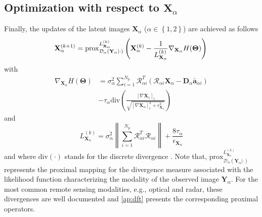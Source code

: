 \documentclass[review]{elsarticle}
\newcommand{\Npatch}{N_{\mathrm{p}}}
\begin{document}
\subsection{Optimization with respect to \texorpdfstring{$\mathbf{X}_{\alpha}$}{X}}

Finally, the updates of the latent images $\mathbf{X}_{\alpha}$ ($\alpha \in \left\{1,2\right\}$) are achieved as follows
%
\begin{equation}
 		\mathbf{X}_{\alpha}^{(k+1)} = \mathrm{prox}^{L_{\mathbf{X}_{\mathrm{\alpha}}}^{(k)}}_{\mathcal{D}_{\mathrm{\alpha}}(\mathbf{Y}_{\mathrm{\alpha}}|\cdot)}\left(\mathbf{X}_{\alpha}^{(k)} - \frac{1}{L_{\mathbf{X}_{\alpha}}^{(k)} }\nabla_{\mathbf{X}_{\alpha}} H(\boldsymbol{\Theta}) \right)
       	\label{eq:latent_Update}\\
\end{equation}
with
\begin{equation}
\begin{aligned}
\nabla_{\mathbf{X}_{\alpha}}H(\boldsymbol{\Theta}) &= \sigma_{\alpha}^2\sum_{i=1}^{\Npatch}\mathcal{R}_{\alpha{i}}^{T}\left(\mathcal{R}_{\alpha{i}}\mathbf{X}_{\alpha} - \mathbf{D}_{\alpha}\bar{\mathbf{a}}_{\alpha{i}}\right) \\
       &- \tau_{\alpha}\mathrm{div}\left( \frac{\left[\nabla\mathbf{X}_{1}\right]_{i}}{\sqrt{\left[\nabla\mathbf{X}_{\alpha}\right]_{i}^{2} + \epsilon_{\mathbf{X}_{\alpha}}^{2}}}\right)
        \label{eq:nabla_latent}
        \end{aligned}
\end{equation}
and
\begin{equation}
		L_{\mathbf{X}_{\mathrm{\alpha}}}^{(k)} = \sigma_{\mathrm{\alpha}}^{2}\left\|\sum_{i=1}^{\Npatch}\mathcal{R}_{\alpha i}^{T}\mathcal{R}_{\alpha i}\right\|+ \frac{8\tau_{\mathrm{\alpha}}}{\epsilon_{\mathbf{X}_{\mathrm{\alpha}}}}
        \label{eq:lip_latent}
\end{equation}
and where $\mathrm{div}(\cdot)$  stands for the discrete divergence \citep{chambolle_algorithm_2004}. Note that, $\mathrm{prox}^{L_{\mathbf{X}_{\mathrm{\alpha}}}^{(k)}}_{\mathcal{D}_{\mathrm{\alpha}}(\mathbf{Y}_{\mathrm{\alpha}}|\cdot)}$ represents the proximal mapping for the divergence measure associated with the likelihood function characterizing the modality of the observed image $\mathbf{Y}_{\alpha}$. For the most common remote sensing modalities, e.g., optical and radar, these divergences are well documented and \ref{ap:dft} presents the corresponding proximal operators.
\end{document}
